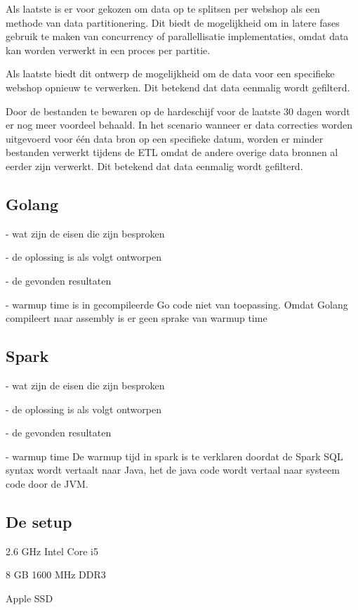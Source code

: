 Als laatste is er voor gekozen om data op te splitsen per webshop als een methode van data partitionering. Dit biedt de mogelijkheid om in latere fases gebruik te maken van concurrency of parallellisatie implementaties, omdat data kan worden verwerkt in een proces per partitie.

Als laatste biedt dit ontwerp de mogelijkheid om de data voor een specifieke webshop opnieuw te verwerken. Dit betekend dat data eenmalig wordt gefilterd. 

Door de bestanden te bewaren op de hardeschijf voor de laatste 30 dagen wordt er nog meer voordeel behaald.
In het scenario wanneer er data correcties worden uitgevoerd voor één data bron op een specifieke datum, worden er minder bestanden verwerkt tijdens de ETL omdat de andere overige data bronnen al eerder zijn verwerkt. Dit betekend dat data eenmalig wordt gefilterd.

\subsection{Golang}

- wat zijn de eisen die zijn besproken

- de oplossing is als volgt ontworpen

- de gevonden resultaten

- warmup time is in gecompileerde Go code niet van toepassing.
Omdat Golang compileert naar assembly is er geen sprake van warmup time

\subsection{Spark}

- wat zijn de eisen die zijn besproken

- de oplossing is als volgt ontworpen

- de gevonden resultaten

- warmup time
De warmup tijd in spark is te verklaren doordat de Spark SQL syntax wordt vertaalt naar Java, het de java code wordt vertaal naar systeem code door de JVM.


\subsection{De setup}
\label{subsec:3.4hardware_specs}


2.6 GHz Intel Core i5

8 GB 1600 MHz DDR3

Apple SSD
